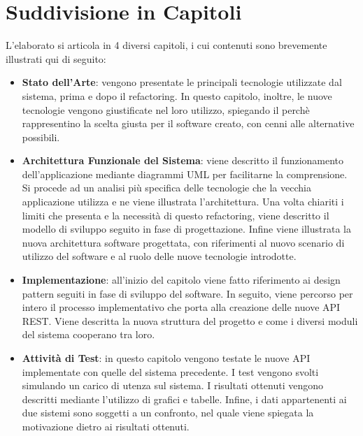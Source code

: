 \section*{Suddivisione in Capitoli}
L'elaborato si articola in 4 diversi capitoli, i cui contenuti sono brevemente illustrati qui di seguito:
\begin{itemize}
    \item \textbf{Stato dell'Arte}: vengono presentate le principali tecnologie utilizzate dal sistema, prima e dopo il refactoring. In questo capitolo, inoltre, le nuove tecnologie vengono giustificate nel loro utilizzo, spiegando il perchè rappresentino la scelta giusta per il software creato, con cenni alle alternative possibili.
    \item \textbf{Architettura Funzionale del Sistema}: viene descritto il funzionamento dell'applicazione mediante diagrammi UML per facilitarne la comprensione. Si procede ad un analisi più specifica delle tecnologie che la vecchia applicazione utilizza e ne viene illustrata l'architettura. Una volta chiariti i limiti che presenta e la necessità di questo refactoring, viene descritto il modello di sviluppo seguito in fase di progettazione. Infine viene illustrata la nuova architettura software progettata, con riferimenti al nuovo scenario di utilizzo del software e al ruolo delle nuove tecnologie introdotte.
    \item \textbf{Implementazione}: all'inizio del capitolo viene fatto riferimento ai design pattern seguiti in fase di sviluppo del software. In seguito, viene percorso per intero il processo implementativo che porta alla creazione delle nuove API REST. Viene descritta la nuova struttura del progetto e come i diversi moduli del sistema cooperano tra loro.
    \item \textbf{Attività di Test}: in questo capitolo vengono testate le nuove API implementate con quelle del sistema precedente. I test vengono svolti simulando un carico di utenza sul sistema. I risultati ottenuti vengono descritti mediante l'utilizzo di grafici e tabelle. Infine, i dati appartenenti ai due sistemi sono soggetti a un confronto, nel quale viene spiegata la motivazione dietro ai risultati ottenuti.
\end{itemize} 
\mainmatter